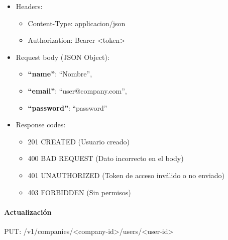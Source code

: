\documentclass[12pt,a4paperpaper,]{report}
\providecommand{\tightlist}{%
  \setlength{\itemsep}{0pt}\setlength{\parskip}{0pt}}
\let\oldparagraph\paragraph
\renewcommand{\paragraph}[1]{\oldparagraph{#1}\mbox{}}
\begin{document}
\begin{itemize}
\tightlist
\item
  Headers:

  \begin{itemize}
  \tightlist
  \item
    Content-Type: applicacion/json
  \item
    Authorization: Bearer \textless{}token\textgreater{}
  \end{itemize}
\item
  Request body (JSON Object):

  \begin{itemize}
  \tightlist
  \item
    \textbf{``name''}: ``Nombre'',
  \item
    \textbf{``email''}: ``user@company.com'',
  \item
    \textbf{``password''}: ``password''
  \end{itemize}
\item
  Response codes:

  \begin{itemize}
  \tightlist
  \item
    201 CREATED (Usuario creado)
  \item
    400 BAD REQUEST (Dato incorrecto en el body)
  \item
    401 UNAUTHORIZED (Token de acceso inválido o no enviado)
  \item
    403 FORBIDDEN (Sin permisos)
  \end{itemize}
\end{itemize}

\paragraph{Actualización}\label{actualizaciuxf3n-1}

PUT:
/v1/companies/\textless{}company-id\textgreater{}/users/\textless{}user-id\textgreater{}
\end{document}
